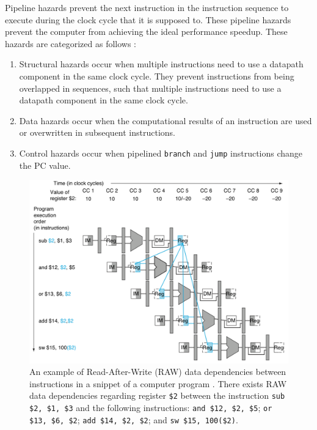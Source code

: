 Pipeline hazards prevent the next instruction in the instruction sequence to execute during the clock cycle that it is supposed to. These pipeline hazards prevent the computer from achieving the ideal performance speedup. These hazards are categorized as follows \cite{Hennessy2012}: \vspace{-0.3cm}
\begin{enumerate} \itemsep -4pt
\item Structural hazards occur when multiple instructions need to use a datapath component in the same clock cycle. They prevent instructions from being overlapped in sequences, such that multiple instructions need to use a datapath component in the same clock cycle.
\item Data hazards occur when the computational results of an instruction are used or overwritten in subsequent instructions.
\item Control hazards occur when pipelined {\tt branch} and {\tt jump} instructions change the PC value.
\end{enumerate}


\begin{figure}[h]
\centering 
\includegraphics[width=6in]{./pics/pipelined-processor-raw-data-dependencies}
\caption{An example of Read-After-Write (RAW) data dependencies \cite{Hennessy2012,Shen2005a} between instructions in a snippet of a computer program \cite{Patterson2012}. There exists RAW data dependencies regarding register {\tt \$2} between the instruction {\tt sub \$2, \$1, \$3} and the following instructions: {\tt and \$12, \$2, \$5}; {\tt or \$13, \$6, \$2}; {\tt add \$14, \$2, \$2}; and {\tt sw \$15, 100(\$2)}. }
\label{fig:pipelinedprocessorrawdatadependencies}
\end{figure}


